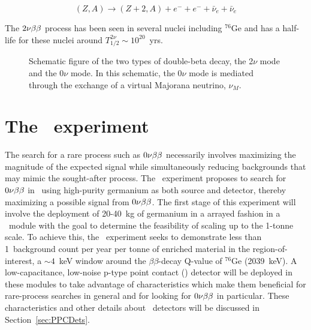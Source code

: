 \begin{equation}
(Z,A) \rightarrow (Z+2,A) + e^- + e^- + \bar{\nu}_e + \bar{\nu}_e
\end{equation}

The $2 \nu \beta \beta$ process has been seen in several nuclei including $^{76}$Ge and has
a half-life for these nuclei around $T^{2\nu}_{1/2}\sim10^{20}$~yrs.  

		\begin{figure}
			\centering
			\def\figheight{0.4\textheight}
		\caption{Schematic figure of the two types of double-beta decay, the 2$\nu$ mode and the 0$\nu$ mode.  
			In this schematic, the 0$\nu$ mode is mediated through the exchange of a virtual Majorana neutrino, $\nu_{M}$.}
		\label{fig:DBDK}
		\end{figure}
 

	
	\section{The \MJ\ experiment}
	\label{sec:MJExperiment}
	
The search for a rare process such as $0 \nu \beta \beta$ necessarily involves maximizing the magnitude of the expected signal while
simultaneously reducing backgrounds that may mimic the sought-after process.  
The \MJ~experiment proposes to search for $0 \nu \beta \beta$ in \gersevensix~using high-purity
germanium as both source and detector, thereby maximizing a possible signal from $0 \nu \beta \beta$. 
The first stage of this experiment will involve the deployment of 20-40~kg of germanium in a arrayed fashion in a \minmod~module with the goal to determine
the feasibility of scaling up to the 1-tonne scale.  To achieve this, the \MJ~experiment seeks to demonstrate less than
1~background count per year per tonne of enriched material in the
region-of-interest, a $\sim4$~keV window around the $\beta\beta$-decay
Q-value of $^{76}$Ge (2039~keV).  A low-capacitance, low-noise p-type point contact (\ppc)
detector will be deployed in these modules to take advantage of characteristics which make 
them beneficial for rare-process searches in general and for looking for $0 \nu \beta \beta$ in particular.  These characteristics and other details about \ppc~detectors will be discussed in Section~\ref{sec:PPCDets}.  

